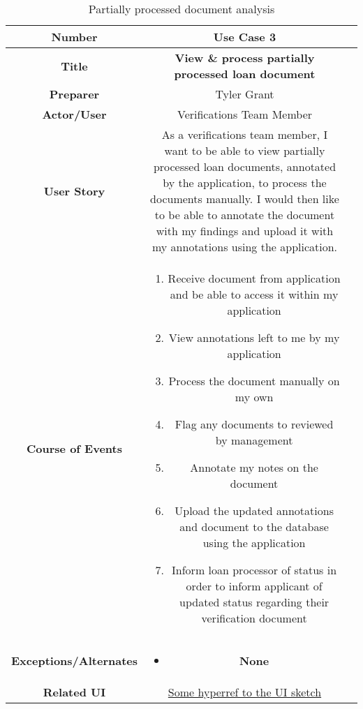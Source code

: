 \begin{table}[H]
    \centering
    \begin{tabularx}{0.75\linewidth}{||Sc|X||}
        \hline
        \hline
        \textbf{Number} & \textbf{Use Case 3} \\
        \hline
        \textbf{Title} & \textbf{View \& process partially processed loan document} \\
        \hline
        \textbf{Preparer} & Tyler Grant \\
        \hline
        \textbf{Actor/User} & Verifications Team Member \\
        \hline
        \textbf{User Story} &
        As a verifications team member, I want to be able to view partially processed loan documents, annotated by the application, to process the documents manually. I would then like to be able to annotate the document with my findings and upload it with my annotations using the application. \\
        \hline
        \textbf{Course of Events} &
        \begin{minipage}[l]{\linewidth}
            \begin{enumerate}[wide, labelindent=0pt]
                \item Receive document from application and be able to access it within my application
                \item View annotations left to me by my application
                \item Process the document manually on my own
                \item Flag any documents to reviewed by management
                \item Annotate my notes on the document
                \item Upload the updated annotations and document to the database using the application
                \item Inform loan processor of status in order to inform applicant of updated status regarding their verification document
            \end{enumerate}
            \vspace{4pt}
        \end{minipage} \\
        \hline
        \textbf{Exceptions/Alternates} & 
        \begin{minipage}[l]{\linewidth}
            \vspace{2pt}
            \begin{itemize}[wide, labelindent=0pt]
                \item \textbf{None}
            \end{itemize}
        \end{minipage} \\
        \hline
        \textbf{Related UI} & \hyperref[templatesec]{Some hyperref to the UI sketch} \\
        \hline
        \hline
    \end{tabularx}
    \caption{Partially processed document analysis}
    \label{tab:use_case_partially_processed}
\end{table}


